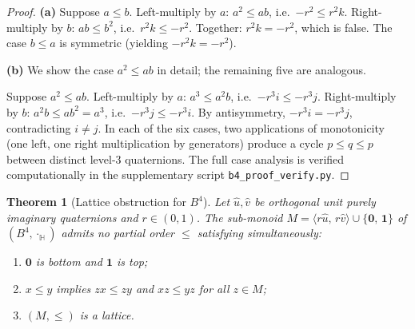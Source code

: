 \documentclass[11pt,a4paper]{article}
\newtheorem{theorem}{Theorem}
\newcommand{\Hq}{\mathbb{H}}
\begin{document}
\begin{proof}
\textbf{(a)} Suppose $a \leq b$. Left-multiply by $a$:
$a^2 \leq ab$, i.e.\ $-r^2 \leq r^2k$. Right-multiply by $b$:
$ab \leq b^2$, i.e.\ $r^2k \leq -r^2$. Together:
$r^2k = -r^2$, which is false. The case $b \leq a$ is symmetric
(yielding $-r^2k = -r^2$).

\textbf{(b)} We show the case $a^2 \leq ab$ in detail; the
remaining five are analogous.

Suppose $a^2 \leq ab$. Left-multiply by $a$: $a^3 \leq a^2 b$,
i.e.\ $-r^3 i \leq -r^3 j$. Right-multiply by $b$:
$a^2 b \leq ab^2 = a^3$, i.e.\ $-r^3 j \leq -r^3 i$.
By antisymmetry, $-r^3 i = -r^3 j$, contradicting $i \neq j$.
In each of the six cases, two applications of monotonicity
(one left, one right multiplication by generators) produce a cycle
$p \leq q \leq p$ between distinct level-3 quaternions. The full
case analysis is verified computationally in the supplementary
script \texttt{b4\_proof\_verify.py}.
\end{proof}

\begin{theorem}[Lattice obstruction for $B^4$]
\label{thm:trilemma-B4}
Let $\hat{u}, \hat{v}$ be orthogonal unit purely imaginary
quaternions and $r \in (0,1)$. The sub-monoid
$M = \langle r\hat{u},\, r\hat{v} \rangle
\cup \{\mathbf{0},\,\mathbf{1}\}$
of $(B^4, \cdot_{\Hq})$ admits no partial order $\leq$ satisfying
simultaneously:
\begin{enumerate}[label=\textup{(\roman*)},nosep]
\item $\mathbf{0}$ is bottom and $\mathbf{1}$ is top;
\item $x \leq y$ implies $zx \leq zy$ and $xz \leq yz$ for all
  $z \in M$;
\item $(M, \leq)$ is a lattice.
\end{enumerate}
\end{theorem}
\end{document}
